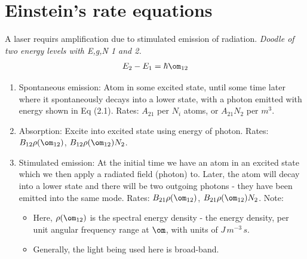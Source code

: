 \documentclass[a4paper, 11pt, normalem]{report}
\begin{document}
\chapter{Einstein's rate equations}
A laser requirs amplification due to stimulated emission of radiation. 
\textit{Doodle of two energy levels with E,g,N 1 and 2.}
\begin{align}
    E_2 - E_1 = \hbar\om_{12}
\end{align}
\begin{enumerate}
    \item Spontaneous emission: Atom in some excited state, until some time later where it spontaneously decays into a lower state, with a photon emitted with energy shown in Eq (2.1). 
        Rates: $A_{21}$ per $N_i$ atoms, or $A_{21}N_2$ per $m^3$.
    \item Absorption: Excite into excited state using energy of photon. 
        Rates: $B_{12}\rho(\om_{12})$, $B_{12}\rho(\om_{12})N_2$.
    \item Stimulated emission: At the initial time we have an atom in an excited state which we then apply a radiated field (photon) to. Later, the atom will decay into a lower state and there will be two outgoing photons - they have been emitted into the same mode.
        Rates: $B_{21}\rho(\om_{12})$, $B_{21}\rho(\om_{12})N_2$. Note: 
        \begin{itemize}
            \item Here, $\rho(\om_{12})$ is the spectral energy density - the energy density, per unit angular frequency range at $\om$, with units of $J\,m^{-3}\,s$.
            \item Generally, the light being used here is broad-band.
        \end{itemize}
\end{enumerate}
\end{document}
